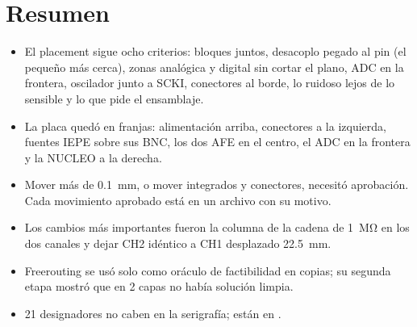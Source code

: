 \section*{Resumen}
\begin{itemize}
  \item El placement sigue ocho criterios: bloques juntos, desacoplo pegado al pin (el pequeño más cerca), zonas
        analógica y digital sin cortar el plano, ADC en la frontera, oscilador junto a SCKI, conectores al borde, lo
        ruidoso lejos de lo sensible y lo que pide el ensamblaje.
  \item La placa quedó en franjas: alimentación arriba, conectores a la izquierda, fuentes IEPE sobre sus BNC, los
        dos AFE en el centro, el ADC en la frontera y la NUCLEO a la derecha.
  \item Mover más de \SI{0.1}{\milli\meter}, o mover integrados y conectores, necesitó aprobación. Cada movimiento
        aprobado está en un archivo  con su motivo.
  \item Los cambios más importantes fueron la columna de la cadena de \SI{1}{\mega\ohm} en los dos canales y dejar CH2
        idéntico a CH1 desplazado \SI{22.5}{\milli\meter}.
  \item Freerouting se usó solo como oráculo de factibilidad en copias; su segunda etapa mostró que en 2 capas no
        había solución limpia.
  \item 21 designadores no caben en la serigrafía; están en .
\end{itemize}
